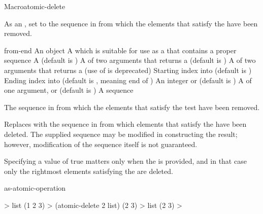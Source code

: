 \documentclass[10pt,twoside,english,pdftex]{article}
\begin{document}
\begin{functiondoc}{Macro}{atomic-delete}{
    }
%

\fnsyntax

\fnpurpose As an , set  to the
sequence in  from which the elements that satisfy the
 have been removed.

\fnpackage {}

\fnmodule {}

\fnargs
\begin{args}{from-end}
\arg[item] An object
\arg[place] A  which is suitable for use as a
 that contains a proper sequence
 A  (default is \nil)
\arg[test] A  of two arguments that returns a
 (default is ) 
 A  of two arguments that returns a
 (use of  is deprecated)
\arg[start] Starting index into  (default is )
\arg[end] Ending index into  (default is \nil, meaning
end of )
\arg[count] An integer or \nil{} (default is \nil)
\arg[key] A  of one argument, or \nil{} (default is \nil)
\arg[sequence] A sequence
\end{args}

\fnreturns The sequence in  from which the elements that
satisfy the test have been removed.

\fndescription Replaces  with the sequence in
 from which elements that satisfy the 
have been deleted.  The supplied  sequence may be modified
in constructing the result; however, modification of the sequence itself is
not guaranteed.

Specifying a  value of true matters only when
the  is provided, and in that case only the rightmost
 elements satisfying the  are deleted.

\begin{alsos}{as-atomic-operation}
\also[delq]
\end{alsos}

\fnexample
%
\W\supp
\begin{example}
  > list
  (1 2 3)
  > (atomic-delete 2 list)
  (2 3)
  > list
  (2 3)
  >
\end{example}

\end{functiondoc}
\end{document}
